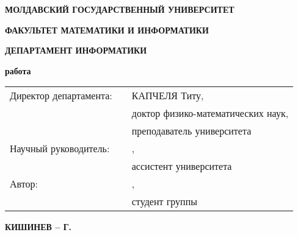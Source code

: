 \begin{titlepage}
  \vspace*{\fill}
  \begin{center}
    \vspace*{1cm}

    \large
    \uppercase{\textbf{МОЛДАВСКИЙ ГОСУДАРСТВЕННЫЙ УНИВЕРСИТЕТ  \\}}

    \normalsize
    \uppercase{\textbf{ФАКУЛЬТЕТ МАТЕМАТИКИ И ИНФОРМАТИКИ}}
    \vspace{0.1cm}

    \normalsize
    \uppercase{\textbf{ДЕПАРТАМЕНТ ИНФОРМАТИКИ}}
    \vspace{3.0cm}

    \large
    \textbf{\correctName{\authorNameRu}}
    \vspace{1.5cm}

    \Large
    \textbf{\MakeUppercase{\thesisTitleRu}}
    \vspace{0.75cm}

    \large
    \textbf{\MakeUppercase{\identificatorulCursuluiRu}}
    \vspace{0.5cm}

    \normalsize
    \textbf{\expandafter\capitalisewords\expandafter{\thesisTypeRu{}} работа}

  \end{center}
  \vfill

  \normalsize

  \begin{flushleft}
    \newcommand{\signatureField}{\textUnderLine{4cm}{(подпись)}}

    \begin{tabular}{p{4.5cm} p{4cm} p{8cm}}
      Директор департамента: & \signatureField{} & КАПЧЕЛЯ Титу, \\
                             &                   & доктор физико-математических наук, \\
                             &                   & преподаватель университета \\
      Научный руководитель:  & \signatureField{} & \correctName{\conducatorNameRu}, \\
                             &                   & ассистент университета \\
      Автор:                 & \signatureField{} & \correctName{\authorNameRu}, \\
                             &                   & студент группы \uniGroupName{} \\
    \end{tabular}

  \end{flushleft}

  \vspace{1cm}

  \begin{center}
    \textbf{КИШИНЕВ -- \year{} Г.}
  \end{center}

\end{titlepage}

